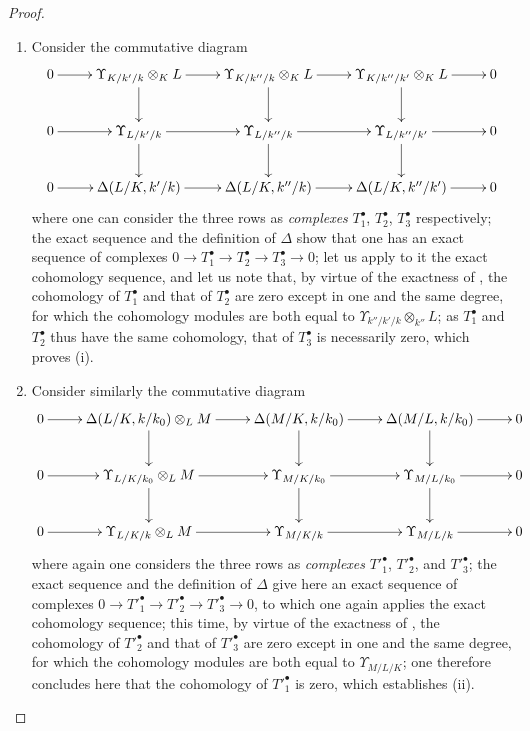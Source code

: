 \begin{proof}
\begin{enumerate}
  \item[(i)] Consider the commutative diagram
  \[
    \xymatrix{
      0\ar[r] & \Upsilon_{K/k'/k}\otimes_K L\ar[r]\ar[d] & \Upsilon_{K/k''/k}\otimes_K L\ar[r]\ar[d] & \Upsilon_{K/k''/k'}\otimes_K L\ar[r]\ar[d] & 0\\
      0\ar[r] & \Upsilon_{L/k'/k}\ar[r]\ar[d] & \Upsilon_{L/k''/k}\ar[r]\ar[d] & \Upsilon_{L/k''/k'}\ar[r]\ar[d] & 0\\
      0\ar[r] & \Delta(L/K,k'/k)\ar[r] & \Delta(L/K,k''/k)\ar[r] & \Delta(L/K,k''/k')\ar[r] & 0
    }
  \]
  where one can consider the three rows as \emph{complexes} $T^\bullet_1$, $T^\bullet_2$, $T^\bullet_3$ respectively; the exact sequence  and the definition of $\Delta$  show that one has an exact sequence of complexes $0\to T^\bullet_1\to T^\bullet_2\to T^\bullet_3\to 0$; let us apply to it the exact
cohomology sequence, and let us note that, by virtue of the exactness of , the cohomology of $T^\bullet_1$ and that of $T^\bullet_2$ are zero except in one and the same degree, for which the cohomology modules are both equal to $\Upsilon_{k''/k'/k}\otimes_{k''}L$; as $T^\bullet_1$ and $T^\bullet_2$ thus have the same cohomology, that of $T^\bullet_3$ is necessarily zero, which proves (i).
  \item[(ii)] Consider similarly the commutative diagram
  \[
    \xymatrix{
      0\ar[r] & \Delta(L/K,k/k_0)\otimes_L M\ar[r]\ar[d] & \Delta(M/K,k/k_0)\ar[r]\ar[d] & \Delta(M/L,k/k_0)\ar[r]\ar[d] & 0\\
      0\ar[r] & \Upsilon_{L/K/k_0}\otimes_L M\ar[r]\ar[d] & \Upsilon_{M/K/k_0}\ar[r]\ar[d] & \Upsilon_{M/L/k_0}\ar[r]\ar[d] & 0\\
      0\ar[r] & \Upsilon_{L/K/k}\otimes_L M\ar[r] & \Upsilon_{M/K/k}\ar[r] & \Upsilon_{M/L/k}\ar[r] & 0
    }
  \]
  where again one considers the three rows as \emph{complexes} $T'^\bullet_1$, $T'^\bullet_2$, and $T'^\bullet_3$; the exact sequence  and the definition of $\Delta$  give here an exact sequence of complexes $0\to T'^\bullet_1\to T'^\bullet_2\to T'^\bullet_3\to 0$, to which one again applies the exact cohomology sequence; this time, by virtue of the exactness of , the cohomology of $T'^\bullet_2$ and that of $T'^\bullet_3$ are zero except in one and the same degree, for which the cohomology modules are both equal to $\Upsilon_{M/L/K}$; one therefore concludes here that the cohomology of $T'^\bullet_1$ is zero, which establishes (ii).
\end{enumerate}
\end{proof}

